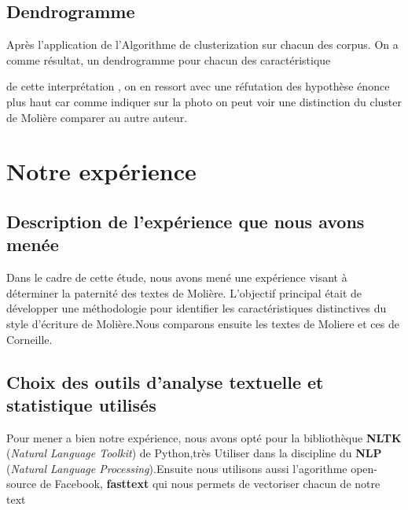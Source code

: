 \documentclass[]{report}
\begin{document}
\subsection{ Dendrogramme }
Après l'application de l'Algorithme de clusterization sur chacun des corpus. On
a comme résultat, un dendrogramme pour chacun des caractéristique   

\begin{center}
\end{center}
 \vspace{\baselineskip}
\hspace{0,5cm}  de cette interprétation , on en ressort avec une réfutation des
hypothèse énonce plus haut car comme indiquer sur la photo on peut voir une
distinction du cluster de Molière comparer au autre auteur.
\section{Notre expérience}

\vspace{\baselineskip}
\subsection{Description de l'expérience que nous avons menée}
\vspace{\baselineskip}
\hspace{0,5cm}Dans le cadre de cette étude, nous avons mené une expérience
visant à déterminer la paternité des textes de Molière. L'objectif principal
était de développer une méthodologie pour identifier les caractéristiques
distinctives du style d'écriture de Molière.Nous comparons ensuite les textes de
Moliere et ces de Corneille.

\subsection{Choix des outils d'analyse textuelle et statistique utilisés}
\vspace{\baselineskip}
\hspace{0,5cm} Pour mener a bien notre expérience, nous avons opté pour la
bibliothèque  \textbf{NLTK} (\textit{Natural Language Toolkit}) de Python,très
Utiliser dans la discipline du \textbf{NLP} (\textit{Natural Language
Processing}).Ensuite nous utilisons aussi l'agorithme open-source de Facebook,
\textbf{fasttext} qui nous permets de vectoriser chacun de notre text
\end{document}

